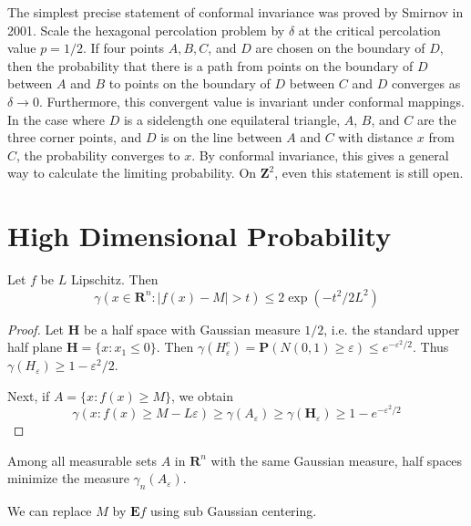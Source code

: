 The simplest precise statement of conformal invariance was proved by Smirnov in 2001. Scale the hexagonal percolation problem by $\delta$ at the critical percolation value $p = 1/2$. If four points $A,B,C$, and $D$ are chosen on the boundary of $D$, then the probability that there is a path from points on the boundary of $D$ between $A$ and $B$ to points on the boundary of $D$ between $C$ and $D$ converges as $\delta \to 0$. Furthermore, this convergent value is invariant under conformal mappings. In the case where $D$ is a sidelength one equilateral triangle, $A$, $B$, and $C$ are the three corner points, and $D$ is on the line between $A$ and $C$ with distance $x$ from $C$, the probability converges to $x$. By conformal invariance, this gives a general way to calculate the limiting probability. On $\mathbf{Z}^2$, even this statement is still open.






\chapter{High Dimensional Probability}

\begin{theorem}
    Let $f$ be $L$ Lipschitz. Then
    \[ \gamma(x \in \mathbf{R}^n: |f(x) - M| > t) \leq 2 \exp(-t^2/2L^2) \]
\end{theorem}
\begin{proof}
    Let $\mathbf{H}$ be a half space with Gaussian measure $1/2$, i.e. the standard upper half plane $\mathbf{H} = \{ x: x_1 \leq 0 \}$. Then $\gamma(H_\varepsilon^c) = \mathbf{P}(N(0,1) \geq \varepsilon) \leq e^{-\varepsilon^2/2}$. Thus $\gamma(H_\varepsilon) \geq 1 - \varepsilon^2/2$.

    Next, if $A = \{ x: f(x) \geq M \}$, we obtain
    \[ \gamma(x: f(x) \geq M - L\varepsilon) \geq \gamma(A_\varepsilon) \geq \gamma(\mathbf{H}_\varepsilon) \geq 1 - e^{-\varepsilon^2/2} \]
\end{proof}

\begin{theorem}
    Among all measurable sets $A$ in $\mathbf{R}^n$ with the same Gaussian measure, half spaces minimize the measure $\gamma_n(A_\varepsilon)$.
\end{theorem}

\begin{remark}
    We can replace $M$ by $\mathbf{E}f$ using sub Gaussian centering.
\end{remark}

